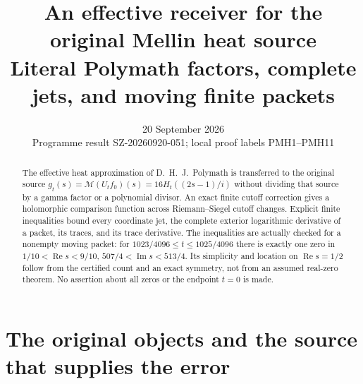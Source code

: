 \documentclass[11pt]{article}
\title{An effective receiver for the original Mellin heat source\\
Literal Polymath factors, complete jets, and moving finite packets}
\author{}
\date{20 September 2026\\Programme result SZ-20260920-051; local proof labels PMH1--PMH11}
\newcommand{\Rea}{\operatorname{Re}}
\newcommand{\Ima}{\operatorname{Im}}
\newcommand{\Mell}{\mathcal M}
\begin{document}
\maketitle

\begin{abstract}
The effective heat approximation of D.~H.~J.~Polymath is transferred to
the original source $g_t(s)=\Mell(U_tf_0)(s)=16H_t((2s-1)/i)$ without
dividing that source by a gamma factor or a polynomial divisor.
An exact finite cutoff correction gives a holomorphic comparison
function across Riemann--Siegel cutoff changes. Explicit finite
inequalities bound every coordinate jet, the complete exterior
logarithmic derivative of a packet, its traces, and its trace derivative.
The inequalities are actually checked for a nonempty moving packet:
for $1023/4096\le t\le1025/4096$ there is exactly one zero in
$1/10<\Rea s<9/10$, $507/4<\Ima s<513/4$.
Its simplicity and location on $\Rea s=1/2$ follow from the certified
count and an exact symmetry, not from an assumed real-zero theorem.
No assertion about all zeros or the endpoint $t=0$ is made.
\end{abstract}

\section{The original objects and the source that supplies the error}
\end{document}

